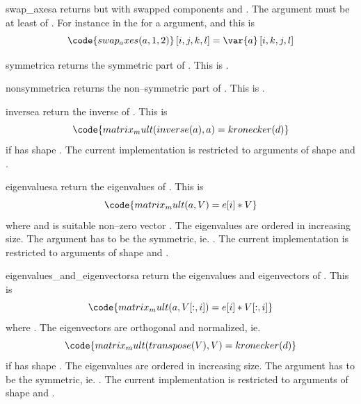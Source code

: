 \begin{funcdesc}{swap_axes}{a}
returns  but with swapped components  and  . The argument  must be
at least of \RankTwo. For instance in the 
for a \RankFour argument,  and  this is
\begin{equation}
\code{swap_axes(a,1,2)}\left[i,j,k,l\right]=\var{a} \left[i,k,j,l\right]
\end{equation} 
\end{funcdesc}

\begin{funcdesc}{symmetric}{a}
returns the symmetric part of . This is .
\end{funcdesc}
\begin{funcdesc}{nonsymmetric}{a}
returns the non--symmetric part of . This is .
\end{funcdesc}
\begin{funcdesc}{inverse}{a}
return the inverse of . This is 
\begin{equation}
\code{matrix_mult(inverse(a),a)=kronecker(d)}
\end{equation} 
if  has shape . The current implementation is restricted to arguments of shape 
 and .
\end{funcdesc}
\begin{funcdesc}{eigenvalues}{a}
return the eigenvalues of . This is 
\begin{equation}
\code{matrix_mult(a,V)=e[i]*V}
\end{equation} 
where  and  is suitable non--zero vector . 
The eigenvalues are ordered in increasing size.
The argument  has to be the symmetric, ie. .  
The current implementation is restricted to arguments of shape 
 and .
\end{funcdesc}
\begin{funcdesc}{eigenvalues_and_eigenvectors}{a}
return the eigenvalues and eigenvectors of . This is 
\begin{equation}
\code{matrix_mult(a,V[:,i])=e[i]*V[:,i]}
\end{equation} 
where . The eigenvectors  are orthogonal and normalized, ie.
\begin{equation}
\code{matrix_mult(transpose(V),V)=kronecker(d)}
\end{equation} 
if  has shape . The eigenvalues are ordered in increasing size.
The argument  has to be the symmetric, ie. .  
The current implementation is restricted to arguments of shape 
 and .
\end{funcdesc}
